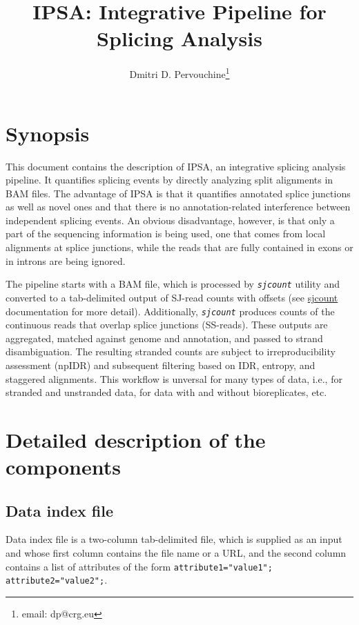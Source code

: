 \documentclass{article}
\newcommand{\prog}[1]{{\tt\em #1}}
\begin{document}
\title{IPSA: Integrative Pipeline for Splicing Analysis}
\author{Dmitri D. Pervouchine\thanks{email: dp@crg.eu}}

\maketitle
\tableofcontents

\section{Synopsis}
This document contains the description of IPSA, an integrative splicing analysis pipeline. 
It quantifies splicing events by directly analyzing split alignments in BAM files. 
The advantage of IPSA is that it quantifies annotated splice junctions as well as novel ones and that there is no annotation-related interference between 
independent splicing events. An obvious disadvantage, however, is that only a part of the 
sequencing information is being used, one that comes from local alignments at splice junctions, 
while the reads that are fully contained in exons or in introns are  being ignored.

The pipeline starts with a BAM file, which is processed by \prog{sjcount} utility and converted to a tab-delimited 
output of SJ-read counts with offsets (see \href{https://github.com/pervouchine/sjcount}{sjcount} documentation 
for more detail). Additionally, \prog{sjcount} produces counts of the continuous reads that overlap splice junctions (SS-reads).
These outputs are aggregated, matched against genome and annotation, and passed to strand disambiguation.
The resulting stranded counts are subject to irreproducibility assessment (npIDR) and subsequent filtering 
based on IDR, entropy, and staggered alignments. This workflow is unversal for many types of data, i.e., for stranded 
and unstranded data, for data with and without bioreplicates, etc.



\section{Detailed description of the components}
\subsection{Data index file}
Data index file is a two-column tab-delimited file, which is supplied as an input and  whose first column contains the file name or a URL, 
and the second column contains a list of attributes of the form {\tt attribute1="value1"; attribute2="value2";}. 
\end{document}
